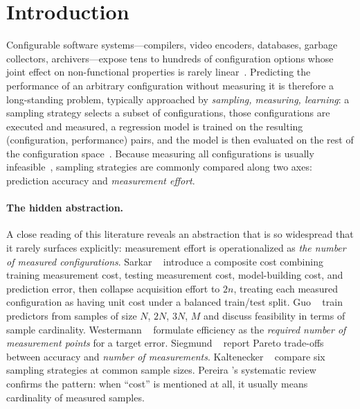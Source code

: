 \section{Introduction}
\label{sec:introduction}

Configurable software systems---compilers, video encoders, databases, garbage
collectors, archivers---expose tens to hundreds of configuration options whose
joint effect on non-functional properties is rarely
linear~\cite{kaltenecker2019,julianasurvey,siegmund2015FSE}. Predicting the
performance of an arbitrary configuration without measuring it is therefore a
long-standing problem, typically approached by \emph{sampling, measuring,
learning}: a sampling strategy selects a subset of configurations, those
configurations are executed and measured, a regression model is trained on the
resulting (configuration, performance) pairs, and the model is then evaluated
on the rest of the configuration space~\cite{guo2013ASE,sarkar2015,kaltenecker2019,siegmund2015FSE,nair2018c}.
Because measuring all configurations is usually
infeasible~\cite{siegmund2015FSE,julianasurvey}, sampling strategies are
commonly compared along two axes: prediction accuracy and \emph{measurement
effort}.

\paragraph*{The hidden abstraction.}
A close reading of this literature reveals an abstraction that is so widespread
that it rarely surfaces explicitly: measurement effort is operationalized as
\emph{the number of measured configurations}. Sarkar
\etal~\cite{sarkar2015} introduce a composite cost combining training
measurement cost, testing measurement cost, model-building cost, and prediction
error, then collapse acquisition effort to $2n$, treating each measured
configuration as having unit cost under a balanced train/test
split. Guo \etal~\cite{guo2013ASE} train predictors from samples of size $N$,
$2N$, $3N$, $M$ and discuss feasibility in terms of sample
cardinality. Westermann \etal~\cite{westermann2012} formulate efficiency as the
\emph{required number of measurement points} for a target error. Siegmund
\etal~\cite{siegmund2015FSE} report Pareto trade-offs between accuracy and
\emph{number of measurements}. Kaltenecker
\etal~\cite{kaltenecker2019} compare six sampling strategies at common sample
sizes. Pereira \etal{}'s systematic review~\cite{julianasurvey} confirms the
pattern: when ``cost'' is mentioned at all, it usually means cardinality of
measured samples.

